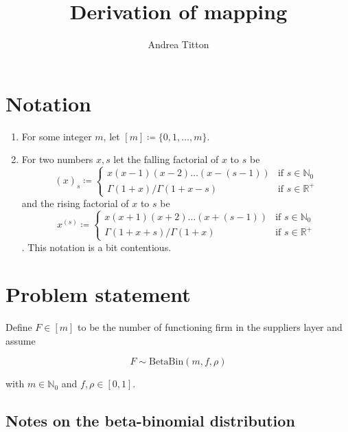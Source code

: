 \documentclass[american, abstract=on]{scrartcl}
\author{Andrea Titton}
\title{Derivation of mapping}
\theoremstyle{plain}
\renewcommand{\Re}{\mathbb{R}}
\newcommand{\Beta}{\text{Beta}}
\newcommand{\Bin}{\text{Bin}}
\begin{document}
\maketitle

\section{Notation}

\begin{enumerate}
    \item For some integer $m$, let $[m] \coloneqq \{0, 1, \ldots, m\}$.
    \item For two numbers $x, s$ let the falling factorial of $x$ to $s$ be \begin{equation}
        (x)_s \coloneqq \begin{cases} x(x - 1)(x - 2)\ldots(x - (s - 1)) & \text{if } s \in \mathbb{N}_0 \\
       \Gamma(1 + x) \Big/ \Gamma(1 + x - s)& \text{if } s \in \Re^{+}
        \end{cases}
    \end{equation} and the rising factorial of $x$ to $s$ be \begin{equation}
        x^{(s)} \coloneqq \begin{cases} x(x + 1)(x + 2)\ldots(x + (s - 1)) & \text{if } s \in \mathbb{N}_0 \\
            \Gamma(1 + x + s) \Big/ \Gamma(1 + x)& \text{if } s \in \Re^{+}
             \end{cases}
    \end{equation}. This notation is a bit contentious.
\end{enumerate}

\section{Problem statement}

Define $F \in [m]$ to be the number of functioning firm in the suppliers layer and assume 

\begin{equation}
    F \sim \Beta\Bin(m, f, \rho)
\end{equation}

with $m \in \mathbb{N}_0$ and $f, \rho \in [0, 1]$.

\subsection{Notes on the beta-binomial distribution}
\end{document}
